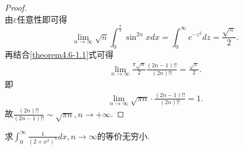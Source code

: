 \documentclass[../../main.tex]{subfiles}
\begin{document}
\begin{proof}
\[\]
由\(\varepsilon\)任意性即可得
\[
\lim_{n\rightarrow\infty}\sqrt{n}\int_{0}^{\frac{\pi}{2}}\sin^{2n}x dx=\int_{0}^{\infty}e^{-z^{2}}dz=\frac{\sqrt{\pi}}{2}.
\]
再结合\eqref{theorem4.6-1.1}式可得
\begin{align*}
\lim_{n\rightarrow \infty} \frac{\pi \sqrt{n}}{2}\frac{(2n-1)!!}{(2n)!!}=\frac{\sqrt{\pi}}{2}.
\end{align*}
即
\begin{align*}
\lim_{n\rightarrow \infty} \sqrt{\pi n}\cdot \frac{(2n-1)!!}{(2n)!!}=1.
\end{align*}
故$\frac{(2n)!!}{(2n-1)!!}\sim \sqrt{\pi n},n\rightarrow +\infty $.
\end{proof}

\begin{example}\label{Laplace方法例题1}
求\(\int_{0}^{\infty} \frac{1}{(2 + x^2)^n}dx, n \to \infty\)的等价无穷小.
\end{example}
\end{document}
